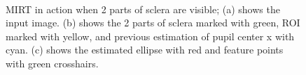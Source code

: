 \begin{figure}[h]
\begin{dBox}
	\mbox{
	\centering
	}
   \caption{MIRT in action when 2 parts of sclera are visible; (a) shows the input image. (b) shows the 2 parts of sclera marked with green, ROI marked with yellow, and previous estimation of pupil center x with cyan. (c) shows the estimated ellipse with red and feature points with green crosshairs. \label{fig:mirt_2p} }      
\end{dBox}   
\end{figure}



